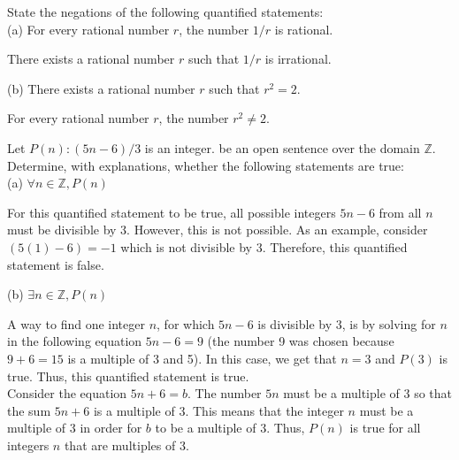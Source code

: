 \documentclass[12pt]{article}
\newcommand{\Z}{\mathbb{Z}}
\newenvironment{problem}[2][Problem]{\begin{trivlist}
		\item[\hskip \labelsep {\bfseries #1}\hskip \labelsep {\bfseries #2.}]}{\end{trivlist}}
\newenvironment{solution}[2][Solution]{\begin{trivlist}
		\item[\hskip \labelsep {\bfseries #1}\hskip \labelsep {\bfseries #2.}]}{\end{trivlist}}
\begin{document}
\begin{problem}{68}
	State the negations of the following quantified statements:\\
	(a) For every rational number $r$, the number $1/r$ is rational.
	\begin{solution}{a}
		There exists a rational number $r$ such that $1/r$ is irrational.
	\end{solution}
	(b) There exists a rational number $r$ such that $r^{2} = 2$.
	\begin{solution}{b}
		For every rational number $r$, the number $r^{2} \neq 2$.
	\end{solution}
\end{problem}

\begin{problem}{69}
	Let $P(n): (5n-6)/3$ is an integer. be an open sentence over the domain $\Z$. Determine, with explanations, whether the following statements are true:\\
	(a) $\forall n \in \Z, P(n)$
	\begin{solution}{a}
		For this quantified statement to be true, all possible integers $5n - 6$ from all $n$ must be divisible by 3. However, this is not possible. As an example, consider $(5(1)-6) = -1$ which is not divisible by 3. Therefore, this quantified statement is false.
	\end{solution}
	(b) $\exists n \in \Z, P(n)$
	\begin{solution}{b}
		A way to find one integer $n$, for which $5n -6$ is divisible by 3, is by solving for $n$ in the following equation $5n-6=9$ (the number 9 was chosen because $9+6=15$ is a multiple of 3 and 5). In this case, we get that $n = 3$ and $P(3)$ is true. Thus, this quantified statement is true. \\
		Consider the equation $5n + 6 = b$. The number $5n$ must be a multiple of 3 so that the sum $5n + 6$ is a multiple of 3. This means that the integer $n$ must be a multiple of 3 in order for $b$ to be a multiple of 3. Thus, $P(n)$ is true for all integers $n$ that are multiples of 3.
	\end{solution} 
\end{problem}
\end{document}
